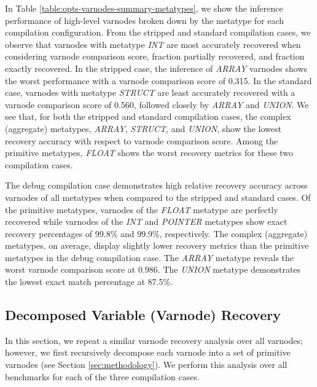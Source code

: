 \documentclass[a4paper,twoside]{article}
\begin{document}


In Table \ref{table:opts-varnodes-summary-metatypes}, we show the inference performance of high-level varnodes broken down by the metatype for each compilation configuration. From the stripped and standard compilation cases, we observe that varnodes with metatype \emph{INT} are most accurately recovered when considering varnode comparison score, fraction partially recovered, and fraction exactly recovered. In the stripped case, the inference of \emph{ARRAY} varnodes shows the worst performance with a varnode comparison score of 0.315. In the standard case, varnodes with metatype \emph{STRUCT} are least accurately recovered with a varnode comparison score of 0.560, followed closely by \emph{ARRAY} and \emph{UNION}. We see that, for both the stripped and standard compilation cases, the complex (aggregate) metatypes, \emph{ARRAY}, \emph{STRUCT}, and \emph{UNION}, show the lowest recovery accuracy with respect to varnode comparison score. Among the primitive metatypes, \emph{FLOAT} shows the worst recovery metrics for these two compilation cases.

The debug compilation case demonstrates high relative recovery accuracy across varnodes of all metatypes when compared to the stripped and standard cases. Of the primitive metatypes, varnodes of the \emph{FLOAT} metatype are perfectly recovered while varnodes of the \emph{INT} and \emph{POINTER} metatypes show exact recovery percentages of 99.8\% and 99.9\%, respectively. The complex (aggregate) metatypes, on average, display slightly lower recovery metrics than the primitive metatypes in the debug compilation case. The \emph{ARRAY} metatype reveals the worst varnode comparison score at 0.986. The \emph{UNION} metatype demonstrates the lowest exact match percentage at 87.5\%.

\subsection{Decomposed Variable (Varnode) Recovery}

In this section, we repeat a similar varnode recovery analysis over all varnodes; however, we first recursively decompose each varnode into a set of primitive varnodes (see Section \ref{sec:methodology}). We perform this analysis over all benchmarks for each of the three compilation cases.


\end{document}
